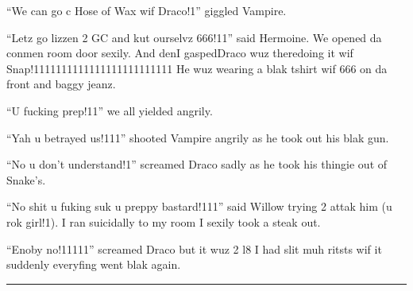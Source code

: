 \enquote{We can go c Hose of Wax wif Draco!1} giggled Vampire.

\enquote{Letz go lizzen 2 GC and kut ourselvz 666!11} said Hermoine. We opened da conmen room door sexily. And den\dotfill\newline I gasped\dotfill Draco wuz there\newline doing it wif Snap!1111111111111111111111111 He wuz wearing a blak tshirt wif 666 on da front and baggy jeanz.

\enquote{U fucking prep!11} we all yielded angrily.

\enquote{Yah u betrayed us!111} shooted Vampire angrily as he took out his blak gun.

\enquote{No u don't understand!1} screamed Draco sadly as he took his thingie out of Snake's.

\enquote{No shit u fuking suk u preppy bastard!111} said Willow trying 2 attak him (u rok girl!1). I ran suicidally to my room I sexily took a steak out.

\enquote{Enoby no!11111} screamed Draco but it wuz 2 l8 I had slit muh ritsts wif it suddenly everyfing went blak again.

\par\nobreak\vspace{1em}\noindent
\rule{1in}{0.4pt}

\begin{sloppypar}
    \noindent{}
\end{sloppypar}